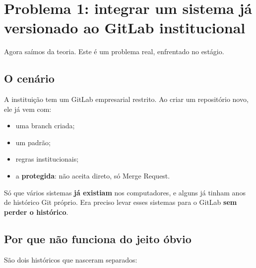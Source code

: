 \chapter{Problema 1: integrar um sistema já versionado ao GitLab institucional}
\label{cap:problema1}

Agora saímos da teoria. Este é um problema real, enfrentado no estágio.

\section{O cenário}

A instituição tem um GitLab empresarial restrito. Ao criar um repositório novo, ele já vem com:

\begin{itemize}
  \item uma branch  criada;
  \item um  padrão;
  \item regras institucionais;
  \item a  \textbf{protegida}: não aceita  direto, só Merge Request.
\end{itemize}

Só que vários sistemas \textbf{já existiam} nos computadores, e alguns já tinham anos de histórico Git próprio. Era preciso levar esses sistemas para o GitLab \textbf{sem perder o histórico}.

\section{Por que não funciona do jeito óbvio}

São dois históricos que nasceram separados:

\begin{center}
\end{center}


